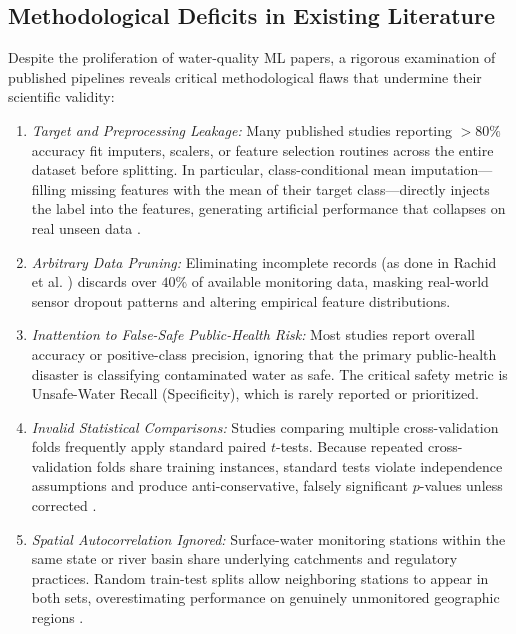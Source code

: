 \documentclass[pdflatex,sn-mathphys-num]{sn-jnl}%
\theoremstyle{thmstyleone}%
\theoremstyle{thmstyletwo}%
\theoremstyle{thmstylethree}%
\begin{document}
\subsection{Methodological Deficits in Existing Literature}\label{subsec2_3}
Despite the proliferation of water-quality ML papers, a rigorous examination of published pipelines reveals critical methodological flaws that undermine their scientific validity:
\begin{enumerate}
    \item \textit{Target and Preprocessing Leakage:} Many published studies reporting $>80\%$ accuracy fit imputers, scalers, or feature selection routines across the entire dataset before splitting. In particular, class-conditional mean imputation---filling missing features with the mean of their target class---directly injects the label into the features, generating artificial performance that collapses on real unseen data \cite{vabalas2019,kapoor2023,kaufman2012}.
    \item \textit{Arbitrary Data Pruning:} Eliminating incomplete records (as done in Rachid et al. \cite{rachid2025}) discards over $40\%$ of available monitoring data, masking real-world sensor dropout patterns and altering empirical feature distributions.
    \item \textit{Inattention to False-Safe Public-Health Risk:} Most studies report overall accuracy or positive-class precision, ignoring that the primary public-health disaster is classifying contaminated water as safe. The critical safety metric is Unsafe-Water Recall (Specificity), which is rarely reported or prioritized.
    \item \textit{Invalid Statistical Comparisons:} Studies comparing multiple cross-validation folds frequently apply standard paired $t$-tests. Because repeated cross-validation folds share training instances, standard tests violate independence assumptions and produce anti-conservative, falsely significant $p$-values unless corrected \cite{nadeau2003}.
    \item \textit{Spatial Autocorrelation Ignored:} Surface-water monitoring stations within the same state or river basin share underlying catchments and regulatory practices. Random train-test splits allow neighboring stations to appear in both sets, overestimating performance on genuinely unmonitored geographic regions \cite{legendre1993,roberts2017,ploton2020}.
\end{enumerate}
\end{document}
